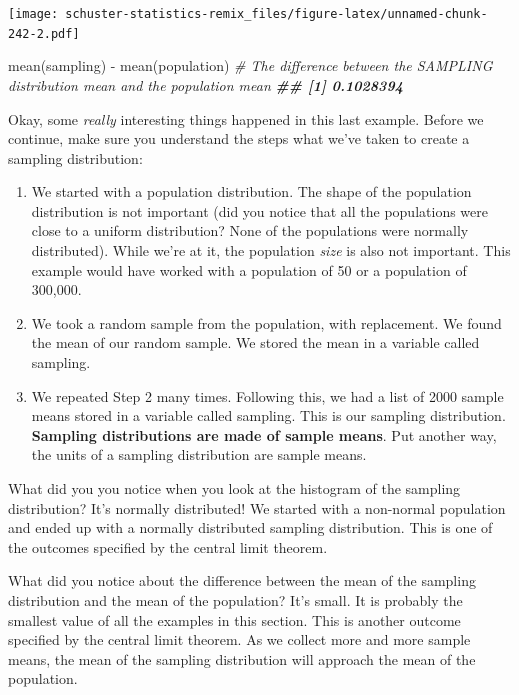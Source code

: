 \documentclass[
]{book}
\newenvironment{Shaded}{\begin{snugshade}}{\end{snugshade}}
\newcommand{\CommentTok}[1]{\textcolor[rgb]{0.56,0.35,0.01}{\textit{#1}}}
\newcommand{\DocumentationTok}[1]{\textcolor[rgb]{0.56,0.35,0.01}{\textbf{\textit{#1}}}}
\newcommand{\FunctionTok}[1]{\textcolor[rgb]{0.00,0.00,0.00}{#1}}
\newcommand{\NormalTok}[1]{#1}
\newcommand{\SpecialCharTok}[1]{\textcolor[rgb]{0.00,0.00,0.00}{#1}}
\providecommand{\tightlist}{%
  \setlength{\itemsep}{0pt}\setlength{\parskip}{0pt}}
\begin{document}
\texttt{[image: schuster-statistics-remix\_files/figure-latex/unnamed-chunk-242-2.pdf]}

\begin{Shaded}
\begin{Highlighting}[]
\FunctionTok{mean}\NormalTok{(sampling) }\SpecialCharTok{{-}} \FunctionTok{mean}\NormalTok{(population) }\CommentTok{\# The difference between the SAMPLING distribution mean and the population mean}
\DocumentationTok{\#\# [1] 0.1028394}
\end{Highlighting}
\end{Shaded}

Okay, some \emph{really} interesting things happened in this last example. Before we continue, make sure you understand the steps what we've taken to create a sampling distribution:

\begin{enumerate}
\def\labelenumi{\arabic{enumi}.}
\tightlist
\item
  We started with a population distribution. The shape of the population distribution is not important (did you notice that all the populations were close to a uniform distribution? None of the populations were normally distributed). While we're at it, the population \emph{size} is also not important. This example would have worked with a population of 50 or a population of 300,000.
\item
  We took a random sample from the population, with replacement. We found the mean of our random sample. We stored the mean in a variable called sampling.
\item
  We repeated Step 2 many times. Following this, we had a list of 2000 sample means stored in a variable called sampling. This is our sampling distribution. \textbf{Sampling distributions are made of sample means}. Put another way, the units of a sampling distribution are sample means.
\end{enumerate}

What did you you notice when you look at the histogram of the sampling distribution? It's normally distributed! We started with a non-normal population and ended up with a normally distributed sampling distribution. This is one of the outcomes specified by the central limit theorem.

What did you notice about the difference between the mean of the sampling distribution and the mean of the population? It's small. It is probably the smallest value of all the examples in this section. This is another outcome specified by the central limit theorem. As we collect more and more sample means, the mean of the sampling distribution will approach the mean of the population.
\end{document}
